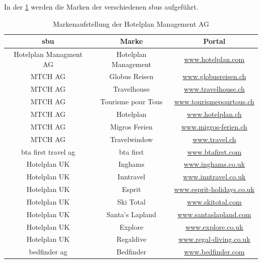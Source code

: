 In der \cref{fig:einleitung:organisationsstruktur:2} werden die Marken der verschiedenen \glspl{sbu} aufgeführt.
\begin{table}[h] 
	\caption{Markenaufstellung der Hotelplan Management AG}
	\centering
	\label{fig:einleitung:organisationsstruktur:2}
	\begin{tabular}{ | c | c | c |} 
		\hline 		
		\rowcolor{tableheadcolor}
		\bfseries \gls{sbu} & \bfseries Marke & \bfseries Portal \\ \hline 
		Hotelplan Managment AG & Hotelplan Management & \href{http://www.hotelplan.com}{www.hotelplan.com} \\ \hline 
		MTCH AG & Globus Reisen & \href{http://www.globusreisen.ch}{www.globusreisen.ch} \\ \hline 
		MTCH AG & Travelhouse & \href{http://www.travelhouse.ch}{www.travelhouse.ch} \\ \hline 
		MTCH AG & Tourisme pour Tous & \href{http://www.tourismepourtous.ch/}{www.tourismepourtous.ch} \\ \hline 
		MTCH AG & Hotelplan & \href{http://www.hotelplan.ch}{www.hotelplan.ch} \\ \hline 
		MTCH AG & Migros Ferien & \href{http://www.migros-ferien.ch}{www.migros-ferien.ch} \\ \hline 
		MTCH AG & Travelwindow & \href{http://www.travel.ch}{www.travel.ch} \\ \hline 
		bta first travel ag & bta first & \href{http://www.btafirst.com}{www.btafirst.com} \\ \hline 
		Hotelplan UK & Inghams & \href{http://www.inghams.co.uk}{www.inghams.co.uk} \\ \hline 
		Hotelplan UK & Inntravel & \href{http://www.inntravel.co.uk}{www.inntravel.co.uk} \\ \hline 
		Hotelplan UK & Esprit & \href{http://www.esprit-holidays.co.uk}{www.esprit-holidays.co.uk} \\ \hline 
		Hotelplan UK & Ski Total & \href{http://www.skitotal.com}{www.skitotal.com} \\ \hline 
		Hotelplan UK & Santa's Lapland & \href{http://www.santaslapland.com}{www.santaslapland.com} \\ \hline 
		Hotelplan UK & Explore & \href{http://www.explore.co.uk}{www.explore.co.uk} \\ \hline 
		Hotelplan UK & Regaldive & \href{http://www.regal-diving.co.uk}{www.regal-diving.co.uk} \\ \hline 
		bedfinder ag & Bedfinder & \href{http://www.bedfinder.com}{www.bedfinder.com} \\ \hline 

\end{tabular}
\end{table}
